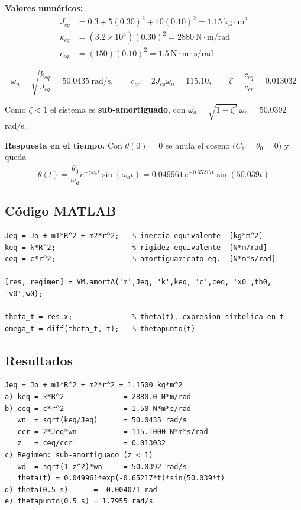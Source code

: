 \documentclass[12pt,letterpaper]{article}
\begin{document}
\textbf{Valores numéricos:}
\begin{align}
J_{eq} &= 0.3 + 5(0.30)^2 + 40(0.10)^2 = 1.15\ \text{kg}\cdot\text{m}^2 \\
k_{eq} &= (3.2\times10^{4})(0.30)^2 = 2880\ \text{N}\cdot\text{m/rad} \\
c_{eq} &= (150)(0.10)^2 = 1.5\ \text{N}\cdot\text{m}\cdot\text{s/rad}
\end{align}

\begin{equation}
\omega_n = \sqrt{\frac{k_{eq}}{J_{eq}}} = 50.0435\ \text{rad/s}, \qquad
c_{cr} = 2J_{eq}\omega_n = 115.10, \qquad
\zeta = \frac{c_{eq}}{c_{cr}} = 0.013032
\end{equation}

Como $\zeta < 1$ el sistema es \textbf{sub-amortiguado}, con
$\omega_d = \sqrt{1-\zeta^2}\,\omega_n = 50.0392$ rad/s.

\textbf{Respuesta en el tiempo.} Con $\theta(0)=0$ se anula el coseno
($C_1 = \theta_0 = 0$) y queda
\begin{equation}
\theta(t) = \frac{\dot{\theta}_0}{\omega_d}e^{-\zeta\omega_n t}\sin(\omega_d t)
= 0.049961\,e^{-0.65217t}\sin(50.039t)
\end{equation}

\subsection{Código MATLAB}
\begin{lstlisting}[style=matlab,numbers=none]
Jeq = Jo + m1*R^2 + m2*r^2;   % inercia equivalente  [kg*m^2]
keq = k*R^2;                  % rigidez equivalente  [N*m/rad]
ceq = c*r^2;                  % amortiguamiento eq.  [N*m*s/rad]

[res, regimen] = VM.amortA('m',Jeq, 'k',keq, 'c',ceq, 'x0',th0, 'v0',w0);

theta_t = res.x;              % theta(t), expresion simbolica en t
omega_t = diff(theta_t, t);   % thetapunto(t)
\end{lstlisting}

\subsection{Resultados}
\begin{lstlisting}[style=consola]
   Jeq = Jo + m1*R^2 + m2*r^2 = 1.1500 kg*m^2
a) keq = k*R^2              = 2880.0 N*m/rad
b) ceq = c*r^2              = 1.50 N*m*s/rad
   wn  = sqrt(keq/Jeq)      = 50.0435 rad/s
   ccr = 2*Jeq*wn           = 115.1000 N*m*s/rad
   z   = ceq/ccr            = 0.013032
c) Regimen: sub-amortiguado (z < 1)
   wd  = sqrt(1-z^2)*wn     = 50.0392 rad/s
   theta(t) = 0.049961*exp(-0.65217*t)*sin(50.039*t)
d) theta(0.5 s)      = -0.004071 rad
e) thetapunto(0.5 s) = 1.7955 rad/s
\end{lstlisting}
\end{document}
